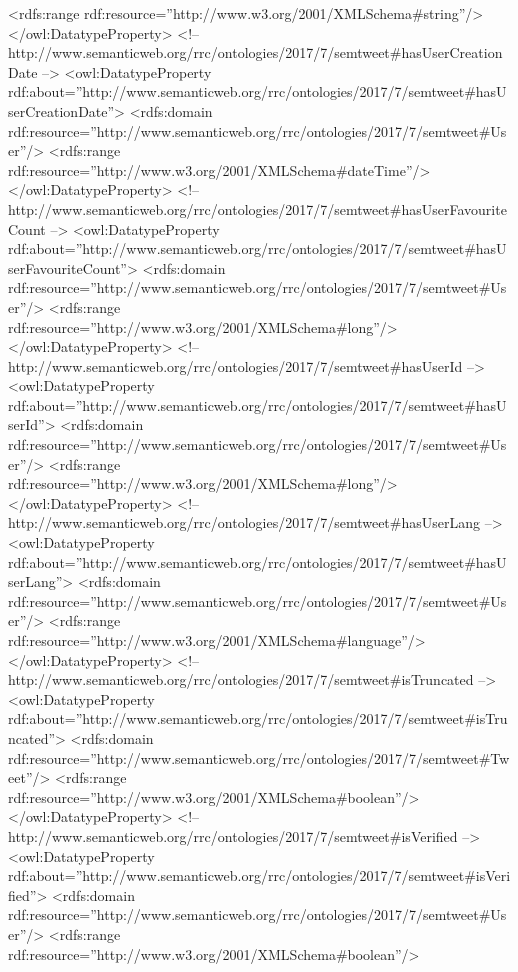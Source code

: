 \begin{listing}[
  language = XML,
  numbers=left,
  numberstyle=\tiny,
  stepnumber=5,
  numbersep=5pt,
  frame=single,
  caption  = {Ontología de tweets: Ontotwitter},
  label    = code:ontotwitter]
        <rdfs:range rdf:resource=''http://www.w3.org/2001/XMLSchema#string''/>
    </owl:DatatypeProperty>
    <!--
    http://www.semanticweb.org/rrc/ontologies/2017/7/semtweet#hasUserCreationDate
    -->
    <owl:DatatypeProperty
    rdf:about=''http://www.semanticweb.org/rrc/ontologies/2017/7/semtweet#hasUserCreationDate''>
        <rdfs:domain
        rdf:resource=''http://www.semanticweb.org/rrc/ontologies/2017/7/semtweet#User''/>
        <rdfs:range rdf:resource=''http://www.w3.org/2001/XMLSchema#dateTime''/>
    </owl:DatatypeProperty>
    <!--
    http://www.semanticweb.org/rrc/ontologies/2017/7/semtweet#hasUserFavouriteCount
    -->
    <owl:DatatypeProperty
    rdf:about=''http://www.semanticweb.org/rrc/ontologies/2017/7/semtweet#hasUserFavouriteCount''>
        <rdfs:domain
        rdf:resource=''http://www.semanticweb.org/rrc/ontologies/2017/7/semtweet#User''/>
        <rdfs:range rdf:resource=''http://www.w3.org/2001/XMLSchema#long''/>
    </owl:DatatypeProperty>
    <!-- http://www.semanticweb.org/rrc/ontologies/2017/7/semtweet#hasUserId -->
    <owl:DatatypeProperty
    rdf:about=''http://www.semanticweb.org/rrc/ontologies/2017/7/semtweet#hasUserId''>
        <rdfs:domain
        rdf:resource=''http://www.semanticweb.org/rrc/ontologies/2017/7/semtweet#User''/>
        <rdfs:range rdf:resource=''http://www.w3.org/2001/XMLSchema#long''/>
    </owl:DatatypeProperty>
    <!-- http://www.semanticweb.org/rrc/ontologies/2017/7/semtweet#hasUserLang
    -->
    <owl:DatatypeProperty
    rdf:about=''http://www.semanticweb.org/rrc/ontologies/2017/7/semtweet#hasUserLang''>
        <rdfs:domain
        rdf:resource=''http://www.semanticweb.org/rrc/ontologies/2017/7/semtweet#User''/>
        <rdfs:range rdf:resource=''http://www.w3.org/2001/XMLSchema#language''/>
    </owl:DatatypeProperty>
    <!-- http://www.semanticweb.org/rrc/ontologies/2017/7/semtweet#isTruncated
    -->
    <owl:DatatypeProperty
    rdf:about=''http://www.semanticweb.org/rrc/ontologies/2017/7/semtweet#isTruncated''>
        <rdfs:domain
        rdf:resource=''http://www.semanticweb.org/rrc/ontologies/2017/7/semtweet#Tweet''/>
        <rdfs:range rdf:resource=''http://www.w3.org/2001/XMLSchema#boolean''/>
    </owl:DatatypeProperty>
    <!-- http://www.semanticweb.org/rrc/ontologies/2017/7/semtweet#isVerified
    -->
    <owl:DatatypeProperty
    rdf:about=''http://www.semanticweb.org/rrc/ontologies/2017/7/semtweet#isVerified''>
        <rdfs:domain
        rdf:resource=''http://www.semanticweb.org/rrc/ontologies/2017/7/semtweet#User''/>
        <rdfs:range rdf:resource=''http://www.w3.org/2001/XMLSchema#boolean''/>

\end{listing}
